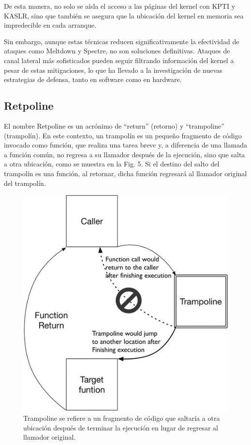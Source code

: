 \documentclass[lettersize,compsoc]{IEEEtran}
\begin{document}
De esta manera, no solo se aísla el acceso a las páginas del kernel con KPTI y KASLR, sino que también se asegura que la ubicación del kernel en memoria sea impredecible en cada arranque.

Sin embargo, aunque estas técnicas reducen significativamente la efectividad de ataques como Meltdown y Spectre, no son soluciones definitivas. Ataques de canal lateral más sofisticados pueden seguir filtrando información del kernel a pesar de estas mitigaciones\cite{Exploits-Parches}, lo que ha llevado a la investigación de nuevas estrategias de defensa, tanto en software como en hardware.

\subsection{Retpoline} El nombre Retpoline es un acrónimo de “return” (retorno) y “trampoline” (trampolín). En este contexto, un trampolín es un pequeño fragmento de código invocado como función, que realiza una tarea breve y, a diferencia de una llamada a función común, no regresa a su llamador después de la ejecución, sino que salta a otra ubicación, como se muestra en la Fig. 5. Si el destino del salto del trampolín es una función, al retornar, dicha función regresará al llamador original del trampolín.\cite{retpoline1}\cite{retpoline2}

\begin{figure}[h] \centering \includegraphics[width=\linewidth]{retpoline.jpg} \caption{\small Trampoline se refiere a un fragmento de código que saltaría a otra ubicación después de terminar la ejecución en lugar de regresar al llamador original.} \end{figure}
\end{document}

